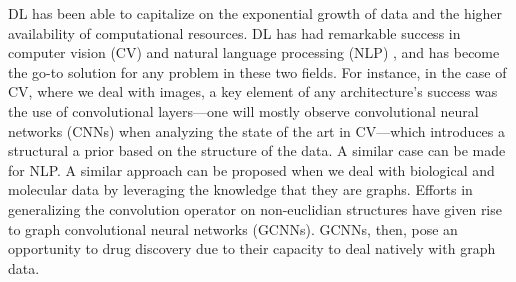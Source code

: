 \documentclass{article}
\begin{document}
 
DL has been able to capitalize on the exponential growth of data and the higher
 availability of computational resources. DL has had remarkable success in computer
 vision (CV) \cite{Guo2016} and natural language processing (NLP) \cite{Young2018}, and
 has become the go-to solution for any problem in these two fields. For instance, in the
 case of CV, where we deal with images, a key element of any architecture's success was
 the use of convolutional layers---one will mostly observe convolutional neural networks
 (CNNs) when analyzing the state of the art in CV---which introduces a structural a
 prior based on the structure of the data\cite{Fukushima1980, LeCun1989, Ulyanov}. A
 similar case can be made for NLP. A similar approach can be proposed when we deal with
 biological and molecular data by leveraging the knowledge that they are graphs. Efforts
 in generalizing the convolution operator on non-euclidian structures have given rise to
 graph convolutional neural networks (GCNNs)\cite{Wu2019}. GCNNs, then, pose an
 opportunity to drug discovery due to their capacity to deal natively with graph
 data\cite{Sun2019}.






\end{document}

